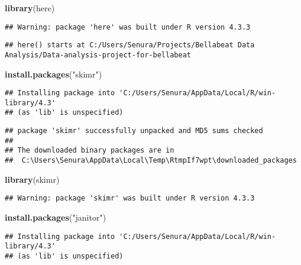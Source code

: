 \documentclass[
]{article}
\newenvironment{Shaded}{\begin{snugshade}}{\end{snugshade}}
\newcommand{\FunctionTok}[1]{\textcolor[rgb]{0.13,0.29,0.53}{\textbf{#1}}}
\newcommand{\NormalTok}[1]{#1}
\newcommand{\StringTok}[1]{\textcolor[rgb]{0.31,0.60,0.02}{#1}}
\begin{document}
\begin{Shaded}
\begin{Highlighting}[]
\FunctionTok{library}\NormalTok{(here)}
\end{Highlighting}
\end{Shaded}

\begin{verbatim}
## Warning: package 'here' was built under R version 4.3.3
\end{verbatim}

\begin{verbatim}
## here() starts at C:/Users/Senura/Projects/Bellabeat Data Analysis/Data-analysis-project-for-bellabeat
\end{verbatim}

\begin{Shaded}
\begin{Highlighting}[]
\FunctionTok{install.packages}\NormalTok{(}\StringTok{"skimr"}\NormalTok{)}
\end{Highlighting}
\end{Shaded}

\begin{verbatim}
## Installing package into 'C:/Users/Senura/AppData/Local/R/win-library/4.3'
## (as 'lib' is unspecified)
\end{verbatim}

\begin{verbatim}
## package 'skimr' successfully unpacked and MD5 sums checked
## 
## The downloaded binary packages are in
##  C:\Users\Senura\AppData\Local\Temp\RtmpIf7wpt\downloaded_packages
\end{verbatim}

\begin{Shaded}
\begin{Highlighting}[]
\FunctionTok{library}\NormalTok{(skimr)}
\end{Highlighting}
\end{Shaded}

\begin{verbatim}
## Warning: package 'skimr' was built under R version 4.3.3
\end{verbatim}

\begin{Shaded}
\begin{Highlighting}[]
\FunctionTok{install.packages}\NormalTok{(}\StringTok{"janitor"}\NormalTok{)}
\end{Highlighting}
\end{Shaded}

\begin{verbatim}
## Installing package into 'C:/Users/Senura/AppData/Local/R/win-library/4.3'
## (as 'lib' is unspecified)
\end{verbatim}
\end{document}
